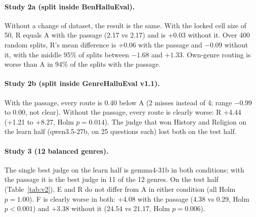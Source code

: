 \documentclass[pdflatex,sn-apa]{sn-jnl}
\begin{document}
\paragraph{Study 2a (split inside BenHalluEval).} Without a change of dataset, the result is the same. With the
locked cell size of 50, R equals A with the passage (2.17 vs 2.17) and is +0.03 without it. Over 400 random splits,
R's mean difference is +0.06 with the passage and $-0.09$ without it, with the middle 95\% of splits between $-1.68$
and $+1.33$. Own-genre routing is worse than A in 94\% of the splits with the passage.

\paragraph{Study 2b (split inside GenreHalluEval v1.1).} With the passage, every route is 0.40 below A (2 misses
instead of 4; range $-0.99$ to $0.00$, not clear). Without the passage, every route is clearly worse: R +4.44 (+1.21 to
+8.27, Holm $p=0.014$). The judge that won History and Religion on the learn half (qwen3.5-27b, on 25 questions each)
lost both on the test half.

\paragraph{Study 3 (12 balanced genres).} The single best judge on the learn half is gemma4-31b in both conditions;
with the passage it is the best judge in 11 of the 12 genres. On the test half (Table~\ref{tab:v2}), E and R do not
differ from A in either condition (all Holm $p=1.00$). F is clearly worse in both: +4.08 with the passage (4.38 vs
0.29, Holm $p<0.001$) and +3.38 without it (24.54 vs 21.17, Holm $p=0.006$).
\end{document}
